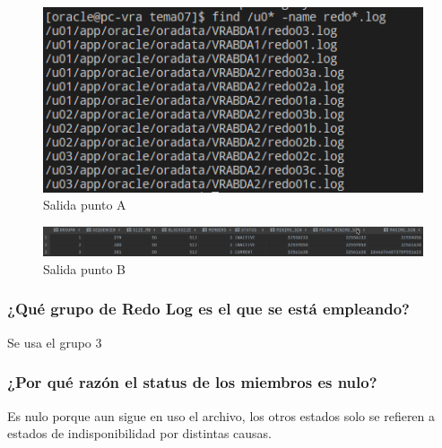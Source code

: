 \documentclass[journal]{IEEEtran}
\begin{document}
\begin{figure}[H]
  \centering
  \includegraphics[scale=.22]{captura_1.png}
   \caption{Salida punto A}
   \label{fig:validador_1}
\end{figure}
\begin{figure}[H]
  \centering
  \includegraphics[scale=.20]{captura_2.png}
   \caption{Salida punto B}
   \label{fig:validador_2}
\end{figure}
\subsubsection{¿Qué grupo de Redo Log es el que se está empleando?}
Se usa el grupo 3
\subsubsection{¿Por qué razón el status de los miembros es nulo?}
Es nulo porque aun sigue en uso el archivo, los otros estados solo se refieren a estados 
de indisponibilidad por distintas causas.
\end{document}
